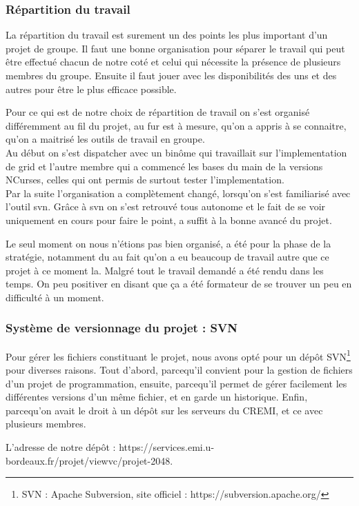 \documentclass[12pt]{article}
\begin{document}
\subsubsection{Répartition du travail}
La répartition du travail est surement un des points les plus important d'un projet de groupe. Il faut une bonne organisation pour séparer le travail qui peut être effectué chacun de notre coté et celui qui nécessite la présence de plusieurs membres du groupe. Ensuite il faut jouer avec les disponibilités des uns et des autres pour être le plus efficace possible.

Pour ce qui est de notre choix de répartition de travail on s'est organisé différemment au fil du projet, au fur est à mesure, qu'on a appris à se connaitre, qu'on a maitrisé les outils de travail en groupe.\\
Au début on s'est dispatcher avec un binôme qui travaillait sur l'implementation de grid et l'autre membre qui a commencé les bases du main de la versions NCurses, celles qui ont permis de surtout tester l'implementation.
\\Par la suite l'organisation a complètement changé, lorsqu'on s'est familiarisé avec l'outil svn. Grâce à svn on s'est retrouvé tous autonome et le fait de se voir uniquement en cours pour faire le point, a suffit à la bonne avancé du projet.

Le seul moment on nous n'étions pas bien organisé, a été pour la phase de la stratégie, notamment du au fait qu'on a eu beaucoup de travail autre que ce projet à ce moment la. Malgré tout le travail demandé a été rendu dans les temps. On peu positiver en disant que ça a été formateur de se trouver un peu en difficulté à un moment.
\subsubsection{Système de versionnage du projet : SVN}
Pour gérer les fichiers constituant le projet, nous avons opté pour un dépôt SVN\footnote{SVN : Apache Subversion, site officiel : https://subversion.apache.org/} pour diverses raisons. Tout d'abord, parcequ'il convient pour la gestion de fichiers d'un projet de programmation, ensuite, parcequ'il permet de gérer facilement les différentes versions d'un même fichier, et en garde un historique. Enfin, parcequ'on avait le droit à un dépôt sur les serveurs du CREMI, et ce avec plusieurs membres.

L'adresse de notre dépôt : https://services.emi.u-bordeaux.fr/projet/viewvc/projet-2048.
\end{document}
